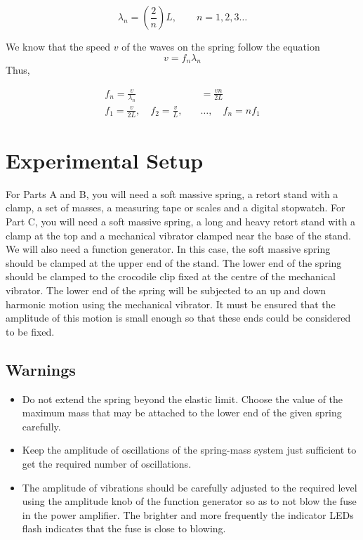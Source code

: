 \begin{equation*}
\lambda_n = \left( \frac{2}{n}\right) L , \quad \quad n=1,2,3\hdots
\end{equation*}

We know that the speed $v$ of the waves on the spring follow the equation $$v = f_n \lambda_n$$ Thus,

\begin{equation}
\begin{aligned}
f_n = \frac{v}{\lambda_n} &= \frac{v n}{2L}\\
f_1 = \frac{v}{2L}, \quad f_2 = \frac{v}{L},\quad &\hdots,\quad f_n = n f_1
\end{aligned}
\end{equation}

\section*{Experimental Setup}

For Parts A and B, you will need a soft massive spring, a retort stand with a clamp, a set of
masses, a measuring tape or scales and a digital stopwatch. For Part C, you will need a soft massive spring, a long and heavy retort stand with a clamp at the top and a mechanical vibrator clamped near the base of the stand. We will also need a function generator. In this case, the soft massive spring should be clamped at the upper end of the stand. The lower end of the spring should be clamped to the crocodile clip fixed at the centre of the mechanical vibrator. The lower end of the spring will be subjected to an up and down harmonic motion using the mechanical vibrator. It must be ensured that the amplitude of this motion is small enough so that these ends could be considered to be fixed.

\subsection*{Warnings}

\begin{itemize}
\item Do not extend the spring beyond the elastic limit. Choose the value of the maximum mass that may be attached to the lower end of the given spring carefully.
\item Keep the amplitude of oscillations of the spring-mass system just sufficient to get the required number of oscillations.
\item The amplitude of vibrations should be carefully adjusted to the required level using the amplitude knob of the function generator so as to not blow the fuse in the power amplifier. The brighter and more frequently the indicator LEDs flash indicates that the fuse is close to blowing.
\end{itemize}

